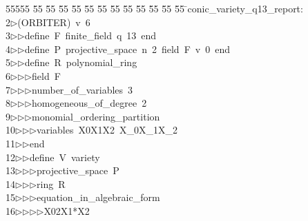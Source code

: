 %
%
\begin{tabbing}
55555 \= 55 \= 55 \= 55 \= 55 \= 55 \= 55 \= 55 \= 55 \= 55 \= 55 \= 55 \= 55 \= \>conic\_variety\_q13\_report:\\[0pt]
2\>$\triangleright$\>(ORBITER)\ v\ 6\ \\[0pt]
3\>$\triangleright$\>$\triangleright$\>define\ F\ finite\_field\ q\ 13\ end\ \\[0pt]
4\>$\triangleright$\>$\triangleright$\>define\ P\ projective\_space\ n\ 2\ field\ F\ v\ 0\ end\ \\[0pt]
5\>$\triangleright$\>$\triangleright$\>define\ R\ polynomial\_ring\ \\[0pt]
6\>$\triangleright$\>$\triangleright$\>$\triangleright$\>field\ F\ \\[0pt]
7\>$\triangleright$\>$\triangleright$\>$\triangleright$\>number\_of\_variables\ 3\ \\[0pt]
8\>$\triangleright$\>$\triangleright$\>$\triangleright$\>homogeneous\_of\_degree\ 2\ \\[0pt]
9\>$\triangleright$\>$\triangleright$\>$\triangleright$\>monomial\_ordering\_partition\ \\[0pt]
10\>$\triangleright$\>$\triangleright$\>$\triangleright$\>variables\ X0X1X2\ X\_0X\_1X\_2\ \\[0pt]
11\>$\triangleright$\>$\triangleright$\>end\ \\[0pt]
12\>$\triangleright$\>$\triangleright$\>define\ V\ variety\ \\[0pt]
13\>$\triangleright$\>$\triangleright$\>$\triangleright$\>projective\_space\ P\ \\[0pt]
14\>$\triangleright$\>$\triangleright$\>$\triangleright$\>ring\ R\ \\[0pt]
15\>$\triangleright$\>$\triangleright$\>$\triangleright$\>equation\_in\_algebraic\_form\ \\[0pt]
16\>$\triangleright$\>$\triangleright$\>$\triangleright$\>$\triangleright$\>X02X1*X2\ \\[0pt]

\end{tabbing}
